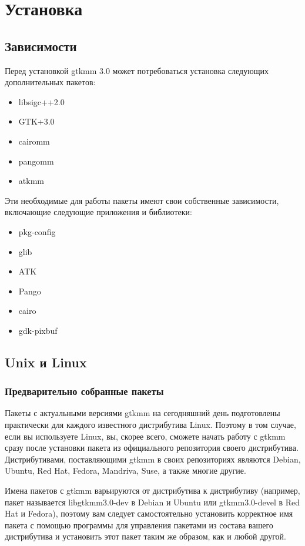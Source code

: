 \chapter{Установка}
\section{Зависимости}
 Перед установкой gtkmm 3.0 может потребоваться установка следующих дополнительных пакетов:
\begin{itemize}
	\item libsigc++2.0
	\item GTK+3.0
	\item cairomm
	\item pangomm
	\item atkmm
\end{itemize}


Эти необходимые для работы пакеты имеют свои собственные зависимости, включающие следующие приложения и библиотеки:
\begin{itemize}
	\item pkg-config
	\item glib
	\item ATK
	\item Pango
	\item cairo
	\item gdk-pixbuf
	
\end{itemize}
\section{Unix и Linux}
\subsection{Предварительно собранные пакеты}
 Пакеты с актуальными версиями gtkmm на сегодняшний день подготовлены практически для каждого известного дистрибутива Linux. Поэтому в том случае, если вы используете Linux, вы, скорее всего, сможете начать работу с gtkmm сразу после установки пакета из официального репозитория своего дистрибутива. Дистрибутивами, поставляющими gtkmm в своих репозиториях являются Debian, Ubuntu, Red Hat, Fedora, Mandriva, Suse, а также многие другие.

Имена пакетов с gtkmm варьируются от дистрибутива к дистрибутиву (например, пакет называется libgtkmm3.0-dev в Debian и Ubuntu или gtkmm3.0-devel в Red Hat и Fedora), поэтому вам следует самостоятельно установить корректное имя пакета с помощью программы для управления пакетами из состава вашего дистрибутива и установить этот пакет таким же образом, как и любой другой. 

